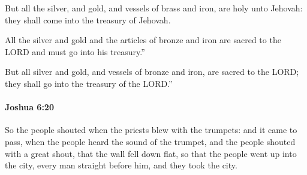 			\begin{versebox}
					\item[BHS] 
					\item[ASV] But all the silver, and gold, and vessels of brass and iron, are holy unto Jehovah: they shall come into the treasury of Jehovah.
					\item[NIV] All the silver and gold and the articles of bronze and iron are sacred to the LORD and must go into his treasury.”
					\item[NRSV] But all silver and gold, and vessels of bronze and iron, are sacred to the LORD; they shall go into the treasury of the LORD.”
			\end{versebox}

		\paragraph{Joshua 6:20} %
			\label{JOSHUA-6-20}

			So the people shouted when the priests blew with the trumpets: and it came to pass, when the people heard the sound of the trumpet, and the people shouted with a great shout, that the wall fell down flat, so that the people went up into the city, every man straight before him, and they took the city.

